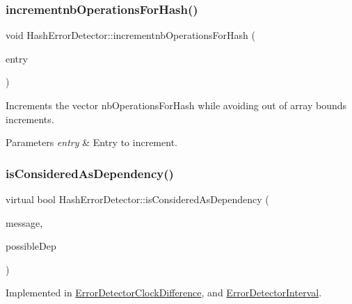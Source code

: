 \subsubsection{\texorpdfstring{incrementnb\+Operations\+For\+Hash()}{incrementnbOperationsForHash()}}
{\footnotesize\ttfamily void Hash\+Error\+Detector\+::incrementnb\+Operations\+For\+Hash (\begin{DoxyParamCaption}\item[{unsigned int}]{entry }\end{DoxyParamCaption})}



Increments the vector nb\+Operations\+For\+Hash while avoiding out of array bounds increments. 


\begin{DoxyParams}{Parameters}
{\em entry} & Entry to increment. \\
\hline
\end{DoxyParams}
\mbox{\label{class_hash_error_detector_a4693d4d5e327b19f75088cef52bcad7d}} 
\subsubsection{\texorpdfstring{is\+Considered\+As\+Dependency()}{isConsideredAsDependency()}}
{\footnotesize\ttfamily virtual bool Hash\+Error\+Detector\+::is\+Considered\+As\+Dependency (\begin{DoxyParamCaption}\item[{const \hyperlink{structures_8h_a7e7bdc1d2fff8a9436f2f352b2711ed6}{message\+Info} \&}]{message,  }\item[{const \hyperlink{structures_8h_a7e7bdc1d2fff8a9436f2f352b2711ed6}{message\+Info} \&}]{possible\+Dep }\end{DoxyParamCaption})\hspace{0.3cm}{\ttfamily [pure virtual]}}



Implemented in \hyperlink{class_error_detector_clock_difference_a4d399849b1872d3273fa757ee9dc9bd9}{Error\+Detector\+Clock\+Difference}, and \hyperlink{class_error_detector_interval_a27cb3ca9d7e5c3ddda9ee5ee66f182ed}{Error\+Detector\+Interval}.

\mbox{\label{class_hash_error_detector_ac0a25b9c1e27f98223869d11ca46d18f}} 

